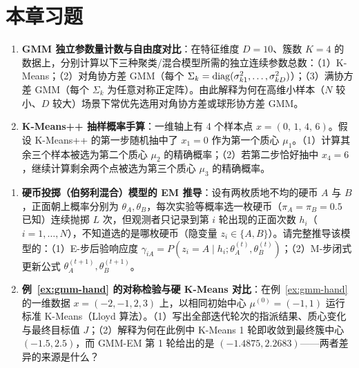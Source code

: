 \section{本章习题}\label{sec:ch6-ex}


\begin{enumerate}[label=\textbf{6.\arabic*}]
  \item \textbf{GMM 独立参数量计数与自由度对比}：在特征维度 $D = 10$、簇数 $K = 4$ 的数据上，分别计算以下三种聚类/混合模型所需的独立连续参数总数：（1）K-Means；（2）对角协方差 GMM（每个 $\Sigma_k = \operatorname{diag}(\sigma_{k1}^2, \dots, \sigma_{kD}^2)$）；（3）满协方差 GMM（每个 $\Sigma_k$ 为任意对称正定阵）。由此解释为何在高维小样本（$N$ 较小、$D$ 较大）场景下常优先选用对角协方差或球形协方差 GMM。

  \item \textbf{K-Means++ 抽样概率手算}：一维轴上有 4 个样本点 $x = (0,\, 1,\, 4,\, 6)$。假设 K-Means++ 的第一步随机抽中了 $x_1 = 0$ 作为第一个质心 $\mu_1$。（1）计算其余三个样本被选为第二个质心 $\mu_2$ 的精确概率；（2）若第二步恰好抽中 $x_4 = 6$，继续计算剩余两个点被选为第三个质心 $\mu_3$ 的精确概率。
\end{enumerate}


\begin{enumerate}[label=\textbf{6.\arabic*}, resume]
  \item \textbf{硬币投掷（伯努利混合）模型的 EM 推导}：设有两枚质地不均的硬币 $A$ 与 $B$，正面朝上概率分别为 $\theta_A, \theta_B$，每次实验等概率选一枚硬币（$\pi_A = \pi_B = 0.5$ 已知）连续抛掷 $L$ 次，但观测者只记录到第 $i$ 轮出现的正面次数 $h_i$（$i = 1, \dots, N$），不知道选的是哪枚硬币（隐变量 $z_i \in \{A, B\}$）。请完整推导该模型的：（1）E-步后验响应度 $\gamma_{iA} = P(z_i = A \mid h_i; \theta_A^{(t)}, \theta_B^{(t)})$；（2）M-步闭式更新公式 $\theta_A^{(t+1)}, \theta_B^{(t+1)}$。

  \item \textbf{例~\ref{ex:gmm-hand} 的对称检验与硬 K-Means 对比}：在例~\ref{ex:gmm-hand} 的一维数据 $x = (-2, -1, 2, 3)$ 上，以相同初始中心 $\mu^{(0)} = (-1, 1)$ 运行标准 K-Means（Lloyd 算法）。（1）写出全部迭代轮次的指派结果、质心变化与最终目标值 $J$；（2）解释为何在此例中 K-Means 1 轮即收敛到最终簇中心 $(-1.5, 2.5)$，而 GMM-EM 第 1 轮给出的是 $(-1.4875, 2.2683)$——两者差异的来源是什么？
\end{enumerate}

